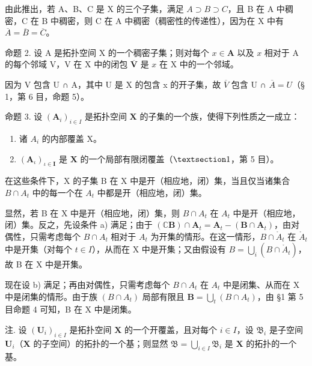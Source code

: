 由此推出，若 A、B、C 是 X 的三个子集，满足 \(A \supset B \supset C\)，且 B 在 A 中稠密，C 在 B 中稠密，则 C 在 A 中稠密（稠密性的传递性），因为在 X 中有 \(\overline{A} = \overline{B} = \overline{C}\)。

命题 2. 设 A 是拓扑空间 X 的一个稠密子集；则对每个 \(x \in \mathbf{A}\) 以及 \(x\) 相对于 A 的每个邻域 V，V 在 X 中的闭包 \(\overline{\mathbf{V}}\) 是 \(x\) 在 X 中的一个邻域。

因为 V 包含 U ∩ A，其中 U 是 X 的包含 x 的开子集，故 \(\overline{V}\) 包含 U ∩ \(\overline{A} = U\)（§ 1，第 6 目，命题 5）。

命题 3. 设 \((\mathbf{A}_i)_{i\in I}\) 是拓扑空间 \(\mathbf{X}\) 的子集的一个族，使得下列性质之一成立：

\begin{enumerate}
\def\labelenumi{\alph{enumi})}
\item
  诸 \(A_{i}\) 的内部覆盖 X。
\item
  \((\mathbf{A}_{\iota})_{\iota \in \mathbf{I}}\) 是 \(\mathbf{X}\) 的一个局部有限闭覆盖（\(\S 1\)，第 5 目）。
\end{enumerate}

在这些条件下，X 的子集 B 在 X 中是开（相应地，闭）集，当且仅当诸集合 \(B \cap A_{t}\) 中的每一个在 \(A_{t}\) 中都是开（相应地，闭）集。

显然，若 B 在 X 中是开（相应地，闭）集，则 \(B \cap A_{t}\) 在 \(A_{t}\) 中是开（相应地，闭）集。反之，先设条件 a) 满足；由于 \((\mathbb{C}\mathbf{B}) \cap \mathbf{A}_{t} = \mathbf{A}_{t} - (\mathbf{B} \cap \mathbf{A}_{t})\)，由对偶性，只需考虑每个 \(B \cap A_{t}\) 相对于 \(A_{t}\) 为开集的情形。在这一情形，\(B \cap \mathring{A}_{t}\) 在 \(\mathring{A}_{t}\) 中是开集（对每个 \(t \in I\)），从而在 X 中是开集；又由假设有 \(B = \bigcup_{i} (B \cap \mathring{A}_{t})\)，故 B 在 X 中是开集。

现在设 b) 满足；再由对偶性，只需考虑每个 \(B \cap A_{t}\) 在 \(A_{t}\) 中是闭集、从而在 X 中是闭集的情形。由于族 \((B \cap A_{t})\) 局部有限且 \(\mathbf{B} = \bigcup_{t} (B \cap A_{t})\)，由 §1 第 5 目命题 4 可知，B 在 X 中是闭集。

注. 设 \((\mathbf{U}_i)_{i\in I}\) 是拓扑空间 \(\mathbf{X}\) 的一个开覆盖，且对每个 \(i\in I\)，设 \(\mathfrak{B}_i\) 是子空间 \(\mathbf{U}_i\)（\(\mathbf{X}\) 的子空间）的拓扑的一个基；则显然 \(\mathfrak{B} = \bigcup_{i\in I}\mathfrak{B}_i\) 是 \(\mathbf{X}\) 的拓扑的一个基。

